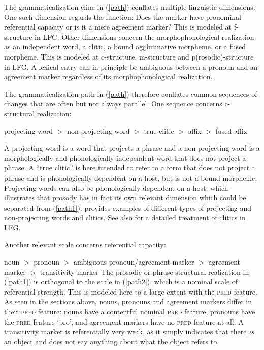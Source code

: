 \documentclass[output=paper,hidelinks]{langscibook}
\begin{document}
The grammaticalization cline in (\ref{path}) conflates multiple linguistic dimensions.  One such dimension   regards the function:   Does the marker have  pronominal referential capacity or is it a mere agreement marker? This is modeled at f-structure in LFG.   Other dimensions concern   the morphophonological realization as an independent word, a clitic,   a bound agglutinative morpheme, or  a  fused morpheme.  This is modeled at c-structure, m-structure and p(rosodic)-structure in LFG. A lexical entry can in principle be ambiguous between a pronoun and an agreement marker regardless of its morphophonological  realization. 

The grammaticalization path in (\ref{path})  therefore   conflates   common sequences of changes that are often but not always parallel.   One sequence concerns   c-structural realization:

 
         \ea \label{path1} 
projecting word  $>$ non-projecting word  $>$ true clitic $>$ affix $>$ fused affix
\z

\noindent A projecting word is a word that projects a phrase and a non-projecting word is a morphologically and phonologically independent word that does not project a phrase.  A ``true clitic''  is here intended to refer to  a form that  does not project a phrase and is phonologically dependent on a host, but is not a bound morpheme. Projecting words can also be phonologically dependent on a host, which illustrates  that prosody has  in fact  its own relevant dimension which could be separated from  (\ref{path1}).  \citet[45]{Toivonen:NonProj}  provides examples of different types of projecting and non-projecting words and clitics.  See also  \citet{lowe:16a} for a   detailed treatment of clitics in LFG.   

 
 
 
 

Another  relevant scale concerns  referential capacity:

 
             \ea \label{path2} 
    noun $>$   pronoun $>$   ambiguous pronoun/agreement marker $>$  agreement marker   $>$ transitivity marker
 \z
   The prosodic or phrase-structural  realization  in (\ref{path1})  is orthogonal to the scale in (\ref{path2}), which is a nominal scale of referential strength. This is modeled here  to a large extent with the \textsc{pred} feature.    As seen in the sections above, nouns, pronouns and agreement markers  differ in their  \textsc{pred} feature:   nouns have a contentful nominal \textsc{pred} feature, pronouns have the \textsc{pred} feature `pro', and agreement markers have no \textsc{pred} feature at all.   A transitivity marker is referentially very weak, as it simply indicates that there \textit{is} an object and does not say anything about what the object refers to. 
 
\end{document}

